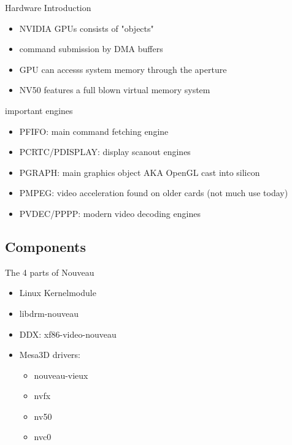 \documentclass[11pt,english,compress]{beamer}
\begin{document}
		\begin{frame}
			\begin{block}{Hardware Introduction}
				\begin{itemize}
					\item NVIDIA GPUs consists of "objects"
					\item command submission by DMA buffers
					\item GPU can accesss system memory through the aperture
					\item NV50 features a full blown virtual memory system
				\end{itemize}
			\end{block}
			\begin{block}{important engines}
				\begin{itemize}
					\item PFIFO: main command fetching engine
					\item PCRTC/PDISPLAY: display scanout engines
					\item PGRAPH: main graphics object AKA OpenGL cast into silicon
					\item PMPEG: video acceleration found on older cards (not much use today)
					\item PVDEC/PPPP: modern video decoding engines %
				\end{itemize}
			\end{block}
		\end{frame}

	\subsection{Components}
		\begin{frame}
			\begin{block}{The 4 parts of Nouveau}
				\begin{itemize}
					\item Linux Kernelmodule
					\item libdrm-nouveau
					\item DDX: xf86-video-nouveau
					\item Mesa3D drivers:
						\begin{itemize}
							\item nouveau-vieux
							\item nvfx
							\item nv50
							\item nvc0
						\end{itemize}
				\end{itemize}
			\end{block}
		\end{frame}
\end{document}

